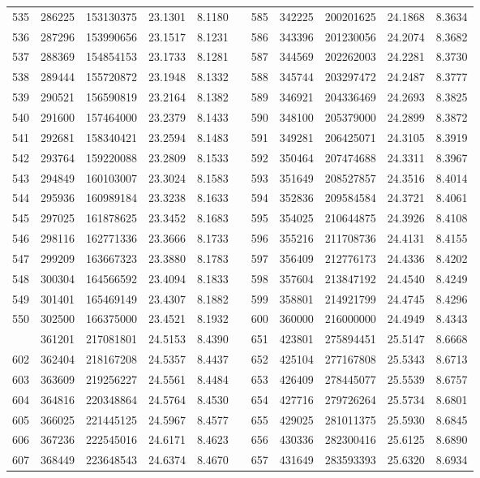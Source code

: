 \begin{longtable}{rrrrrrrrrrr}
535&286225&153130375&23.1301&8.1180&&585&342225&200201625&24.1868&8.3634\\
536&287296&153990656&23.1517&8.1231&&586&343396&201230056&24.2074&8.3682\\
537&288369&154854153&23.1733&8.1281&&587&344569&202262003&24.2281&8.3730\\
538&289444&155720872&23.1948&8.1332&&588&345744&203297472&24.2487&8.3777\\
539&290521&156590819&23.2164&8.1382&&589&346921&204336469&24.2693&8.3825\\
540&291600&157464000&23.2379&8.1433&&590&348100&205379000&24.2899&8.3872\\
541&292681&158340421&23.2594&8.1483&&591&349281&206425071&24.3105&8.3919\\
542&293764&159220088&23.2809&8.1533&&592&350464&207474688&24.3311&8.3967\\
543&294849&160103007&23.3024&8.1583&&593&351649&208527857&24.3516&8.4014\\
544&295936&160989184&23.3238&8.1633&&594&352836&209584584&24.3721&8.4061\\
545&297025&161878625&23.3452&8.1683&&595&354025&210644875&24.3926&8.4108\\
546&298116&162771336&23.3666&8.1733&&596&355216&211708736&24.4131&8.4155\\
547&299209&163667323&23.3880&8.1783&&597&356409&212776173&24.4336&8.4202\\
548&300304&164566592&23.4094&8.1833&&598&357604&213847192&24.4540&8.4249\\
549&301401&165469149&23.4307&8.1882&&599&358801&214921799&24.4745&8.4296\\
550&302500&166375000&23.4521&8.1932&&600&360000&216000000&24.4949&8.4343\\
\newpage
601&361201&217081801&24.5153&8.4390&&651&423801&275894451&25.5147&8.6668\\
602&362404&218167208&24.5357&8.4437&&652&425104&277167808&25.5343&8.6713\\
603&363609&219256227&24.5561&8.4484&&653&426409&278445077&25.5539&8.6757\\
604&364816&220348864&24.5764&8.4530&&654&427716&279726264&25.5734&8.6801\\
605&366025&221445125&24.5967&8.4577&&655&429025&281011375&25.5930&8.6845\\
606&367236&222545016&24.6171&8.4623&&656&430336&282300416&25.6125&8.6890\\
607&368449&223648543&24.6374&8.4670&&657&431649&283593393&25.6320&8.6934\\

\end{longtable}
